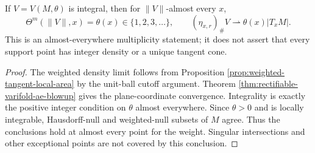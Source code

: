 \begin{corollary}\label{cor:integral-varifold-density-multiplicity}
If $V=V(M,\theta)$ is integral, then for $\|V\|$-almost every $x$,
\[
 \Theta^m(\|V\|,x)=\theta(x)\in\{1,2,3,\ldots\},
 \qquad (\eta_{x,r})_\#V\rightharpoonup\theta(x)|T_xM|.
\]
This is an almost-everywhere multiplicity statement; it does not assert that every support point has integer density or a unique tangent cone.
\end{corollary}
\begin{proof}
The weighted density limit follows from Proposition \ref{prop:weighted-tangent-local-area} by the unit-ball cutoff argument. Theorem \ref{thm:rectifiable-varifold-ae-blowup} gives the plane-coordinate convergence. Integrality is exactly the positive integer condition on $\theta$ almost everywhere. Since $\theta>0$ and is locally integrable, Hausdorff-null and weighted-null subsets of $M$ agree. Thus the conclusions hold at almost every point for the weight. Singular intersections and other exceptional points are not covered by this conclusion.
\end{proof}
